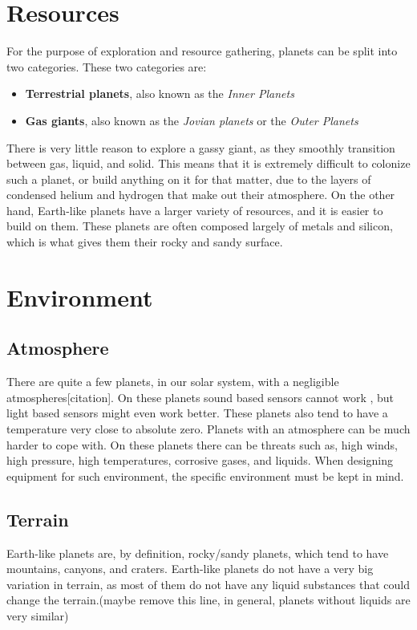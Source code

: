 \clearpage

\section{Resources}
For the purpose of exploration and resource gathering, planets can be split into two categories. These two categories are:\cite{planettypes}
\begin{itemize}
	\item{\textbf{Terrestrial planets}, also known as the \textit{Inner Planets}}
	\item{\textbf{Gas giants}, also known as the \textit{Jovian planets} or the \textit{Outer Planets}}
\end{itemize}

There is very little reason to explore a gassy giant, as they smoothly transition between gas, liquid, and solid. This means that it is extremely difficult to colonize such a planet, or build anything on it for that matter, due to the layers of condensed helium and hydrogen that make out their atmosphere\cite{outerplanetatmosphere}.
On the other hand, Earth-like planets have a larger variety of resources, and it is easier to build on them. These planets are often composed largely of metals and silicon, which is what gives them their rocky and sandy surface.

\section{Environment}
\subsection{Atmosphere}
There are quite a few planets, in our solar system, with a negligible atmospheres[citation]. On these planets sound based sensors cannot work
, but light based sensors might even work better. These planets also tend to have a temperature very close to absolute zero\cite{planetstemp}.
Planets with an atmosphere can be much harder to cope with. On these planets there can be threats such as, high winds, high pressure, high temperatures, corrosive gases, and liquids. When designing equipment for such environment, the specific environment must be kept in mind.

\subsection{Terrain}
Earth-like planets are, by definition, rocky/sandy planets, which tend to have mountains, canyons, and craters.
Earth-like planets do not have a very big variation in terrain, as most of them do not have any liquid substances that could change the terrain.(maybe remove this line, in general, planets without liquids are very similar)

